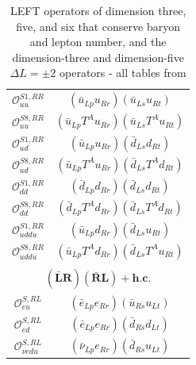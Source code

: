\begin{table}[htbp]
{\begin{tabular}[t]{c|c}
        $\mathcal{O}_{uu}^{S1,RR}$ & $(\bar{u}_{Lp} u_{Rr})(\bar{u}_{Ls} u_{Rt})$ \\
        $\mathcal{O}_{uu}^{S8,RR}$ & $(\bar{u}_{Lp} T^A u_{Rr})(\bar{u}_{Ls} T^A u_{Rt})$ \\
        $\mathcal{O}_{ud}^{S1,RR}$ & $(\bar{u}_{Lp} u_{Rr})(\bar{d}_{Ls} d_{Rt})$ \\
        $\mathcal{O}_{ud}^{S8,RR}$ & $(\bar{u}_{Lp} T^A u_{Rr})(\bar{d}_{Ls} T^A d_{Rt})$ \\
        $\mathcal{O}_{dd}^{S1,RR}$ & $(\bar{d}_{Lp} d_{Rr})(\bar{d}_{Ls} d_{Rt})$ \\
        $\mathcal{O}_{dd}^{S8,RR}$ & $(\bar{d}_{Lp} T^A d_{Rr})(\bar{d}_{Ls} T^A d_{Rt})$ \\
        $\mathcal{O}_{uddu}^{S1,RR}$ & $(\bar{u}_{Lp} d_{Rr})(\bar{d}_{Ls} u_{Rt})$ \\
        $\mathcal{O}_{uddu}^{S8,RR}$ & $(\bar{u}_{Lp} T^A d_{Rr})(\bar{d}_{Ls} T^A u_{Rt})$ \\
        \multicolumn{2}{c}{\vspace{-0.5em}} \\ %
        \multicolumn{2}{c}{\textbf{$\boldsymbol{(\bar{L}R)(\bar{R}L) + \text{h.c.}}$}} \\ \hline
        $\mathcal{O}_{eu}^{S,RL}$ & $(\bar{e}_{Lp} e_{Rr})(\bar{u}_{Rs} u_{Lt})$ \\
        $\mathcal{O}_{ed}^{S,RL}$ & $(\bar{e}_{Lp} e_{Rr})(\bar{d}_{Rs} d_{Lt})$ \\
        $\mathcal{O}_{\nu edu}^{S,RL}$ & $(\bar{\nu}_{Lp} e_{Rr})(\bar{d}_{Rs} u_{Lt})$
    \end{tabular}
    } %
    \caption{LEFT operators of dimension three, five, and six that conserve baryon and lepton
    number, and the dimension-three and dimension-five $\Delta L = \pm 2$ operators - all tables from \parencite[p.32]{jenkins2018lowOM}}
    \label{tab:LEFTbasisLNC}
\end{table}
    

